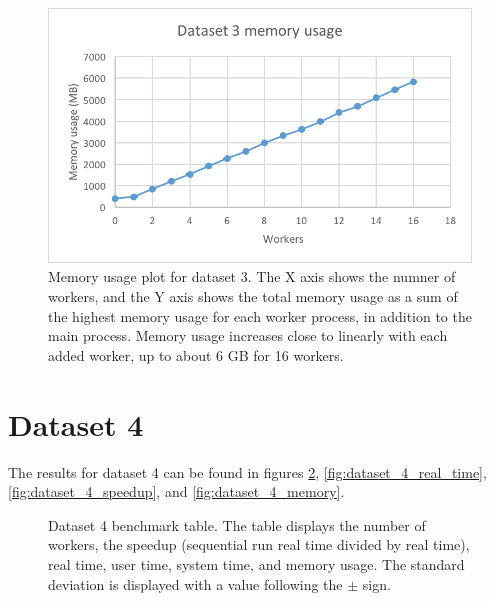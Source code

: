 \begin{figure}[ht]
  \centering
  \includegraphics[width=120mm]{figures/dataset_3/dataset_3_memory.png}
  \caption[Memory usage plot for dataset 3.]{Memory usage plot for dataset 3. The X axis shows the numner of workers, and the Y axis shows the total memory usage as
  a sum of the highest memory usage for each worker process, in addition to the main process. Memory usage increases close to linearly with each added worker,
  up to about 6 GB for 16 workers.}
  \label{fig:dataset_3_memory}
\end{figure}


\section{Dataset 4}
The results for dataset 4 can be found in figures \ref{fig:dataset_4_table}, \ref{fig:dataset_4_real_time}, \ref{fig:dataset_4_speedup}, and \ref{fig:dataset_4_memory}.

\begin{figure}[ht]
\centering
{}
\caption[Dataset 4 benchmark table.]{Dataset 4 benchmark table. The table displays the number of workers, the speedup (sequential run real time divided by real time), real time,
user time, system time, and memory usage. The standard deviation is displayed with a value following the $\pm$ sign.}
\label{fig:dataset_4_table}
\end{figure}

